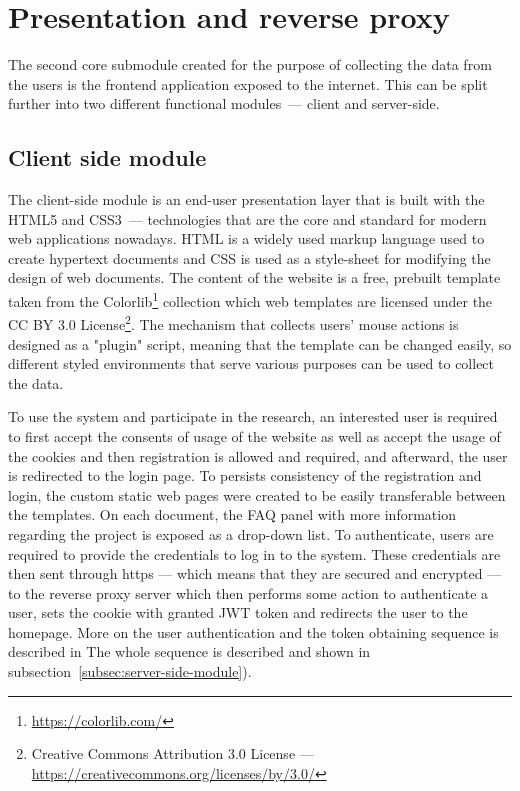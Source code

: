 \section{Presentation and reverse proxy}\label{sec:reverse-proxy}
The second core submodule created for the purpose of collecting the data from the users is the frontend application exposed to the internet.
This can be split further into two different functional modules~--- client and server-side.

\subsection{Client side module}\label{subsec:client-side-module}
The client-side module is an end-user presentation layer that is built with the HTML5 and CSS3~--- technologies that are the core and standard for modern web applications nowadays.
HTML is a widely used markup language used to create hypertext documents and CSS is used as a style-sheet for modifying the design of web documents.
The content of the website is a free, prebuilt template taken from the Colorlib\footnote{\url{https://colorlib.com/}} collection which web templates are licensed under the CC BY 3.0 License\footnote{Creative Commons Attribution 3.0 License --- \url{https://creativecommons.org/licenses/by/3.0/}}.
The mechanism that collects users' mouse actions is designed as a "plugin" script, meaning that the template can be changed easily, so different styled environments that serve various purposes can be used to collect the data.

To use the system and participate in the research, an interested user is required to first accept the consents of usage of the website as well as accept the usage of the cookies and then registration is allowed and required, and afterward, the user is redirected to the login page.
To persists consistency of the registration and login, the custom static web pages were created to be easily transferable between the templates.
On each document, the FAQ panel with more information regarding the project is exposed as a drop-down list.
To authenticate, users are required to provide the credentials to log in to the system.
These credentials are then sent through https --- which means that they are secured and encrypted --- to the reverse proxy server which then performs some action to authenticate a user, sets the cookie with granted JWT token and redirects the user to the homepage.
More on the user authentication and the token obtaining sequence is described in
The whole sequence is described and shown in subsection~\ref{subsec:server-side-module}).

